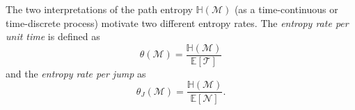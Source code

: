 \documentclass[smallextended]{svjour3}
\newcommand{\E}{\mathbb{E}}
\newcommand{\TT}{\mathcal{T}}
\renewcommand{\H}{\mathbb{H}}
\newcommand{\red}[1]{\textcolor{red}{#1}}
\begin{document}
% 

The two interpretations of the path entropy $\H(\mathcal{M})$ (as a time-continuous or time-discrete process) motivate two different entropy rates.
The \emph{entropy rate per unit time} is defined as
\begin{equation*}
  \theta(\mathcal{M}) = \frac{\H(\mathcal{M})}{\E\left[\TT\right]}
\end{equation*}
and the \emph{entropy rate per jump} as
\begin{equation*}
  \theta_J(\mathcal{M}) = \frac{\H(\mathcal{M})}{\E\left[\mathcal{N}\right]}.
\end{equation*}
\end{document}
